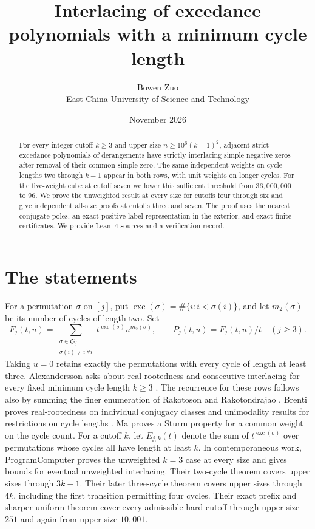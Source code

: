 \documentclass[11pt]{article}
\title{Interlacing of excedance polynomials with a minimum cycle length}
\author{Bowen Zuo\\[2pt]\small East China University of Science and Technology}
\date{November 2026}
\newcommand{\exc}{\operatorname{exc}}
\begin{document}
\maketitle
\begin{abstract}
For every integer cutoff \(k\ge3\) and upper size \(n\ge10^6(k-1)^2\), adjacent strict-excedance polynomials of derangements have strictly interlacing simple negative zeros after removal of their common simple zero. The same independent weights on cycle lengths two through \(k-1\) appear in both rows, with unit weights on longer cycles. For the five-weight cube at cutoff seven we lower this sufficient threshold from \(36{,}000{,}000\) to \(96\). We prove the unweighted result at every size for cutoffs four through six and give independent all-size proofs at cutoffs three and seven. The proof uses the nearest conjugate poles, an exact positive-label representation in the exterior, and exact finite certificates. We provide Lean~4 sources and a verification record.
\end{abstract}

\section{The statements}
For a permutation \(\sigma\) on \([j]\), put \(\exc(\sigma)=\#\{i:i<\sigma(i)\}\), and let \(m_2(\sigma)\) be its number of cycles of length two. Set
\[
 F_j(t,u)=\sum_{\substack{\sigma\in\mathfrak S_j\\ \sigma(i)\ne i\ \forall i}}
       t^{\exc(\sigma)}u^{m_2(\sigma)},\qquad
 P_j(t,u)=F_j(t,u)/t\quad(j\ge3).
\]
Taking \(u=0\) retains exactly the permutations with every cycle of length at least three. Alexandersson asks about real-rootedness and consecutive interlacing for every fixed minimum cycle length \(k\ge3\) \cite{alex}. The recurrence for these rows follows also by summing the finer enumeration of Rakotoson and Rakotondrajao \cite[Theorem~30]{rr}. Brenti proves real-rootedness on individual conjugacy classes and unimodality results for restrictions on cycle lengths \cite[Theorems~3.2--3.4]{brenti}. Ma \cite[Theorem~3.5]{ma} proves a Sturm property for a common weight on the cycle count.
For a cutoff \(k\), let \(E_{j,k}(t)\) denote the sum of \(t^{\exc(\sigma)}\) over permutations whose cycles all have length at least \(k\).
In contemporaneous work, ProgramComputer \cite{programcomputer,programcomputer3} proves the unweighted \(k=3\) case at every size and gives bounds for eventual unweighted interlacing. Their two-cycle theorem \cite{programcomputer2} covers upper sizes through \(3k-1\). Their later three-cycle theorem \cite{programcomputer4} covers upper sizes through \(4k\), including the first transition permitting four cycles. Their exact prefix and sharper uniform theorem \cite{programcomputer5,programcomputer6,programcomputer7} cover every admissible hard cutoff through upper size \(251\) and again from upper size \(10{,}001\).
\end{document}
